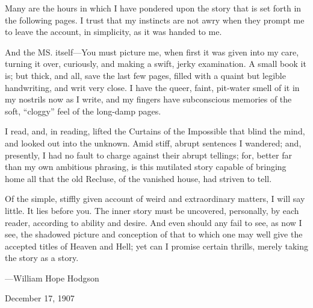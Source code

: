 \documentclass{novel} %
\begin{document}
\begin{ChapterStart}[7]
\null\null
{}
\end{ChapterStart}
Many are the hours in which I have pondered upon the story that is set forth in the following pages. I trust that my instincts are not awry when they prompt me to leave the account, in simplicity, as it was handed to me.\par
And the MS. itself---You must picture me, when first it was given into my care, turning it over, curiously, and making a swift, jerky examination. A small book it is; but thick, and all, save the last few pages, filled with a quaint but legible handwriting, and writ very close. I have the queer, faint, pit-water smell of it in my nostrils now as I write, and my fingers have subconscious memories of the soft, “cloggy” feel of the long-damp pages.\par
I read, and, in reading, lifted the Curtains of the Impossible that blind the mind, and looked out into the unknown. Amid stiff, abrupt sentences I wandered; and, presently, I had no fault to charge against their abrupt tellings; for, better far than my own ambitious phrasing, is this mutilated story capable of bringing home all that the old Recluse, of the vanished house, had striven to tell.\par
Of the simple, stiffly given account of weird and extraordinary matters, I will say little. It lies before you. The inner story must be uncovered, personally, by each reader, according to ability and desire. And even should any fail to see, as now I see, the shadowed picture and conception of that to which one may well give the accepted titles of Heaven and Hell; yet can I promise certain thrills, merely taking the story as a story.\par
\null
\stake\hfill---William Hope Hodgson\par
\stake\hfill December 17, 1907\par
\end{document}
